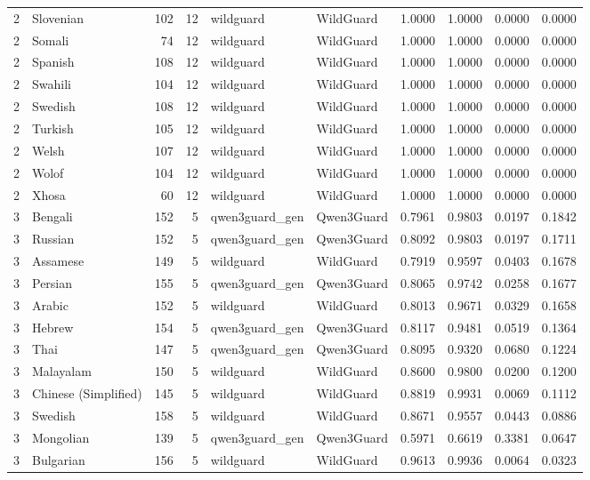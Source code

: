 \begin{tabular}{rlrrllrrrr}
2 & Slovenian & 102 & 12 & wildguard & WildGuard & 1.0000 & 1.0000 & 0.0000 & 0.0000 \\
2 & Somali & 74 & 12 & wildguard & WildGuard & 1.0000 & 1.0000 & 0.0000 & 0.0000 \\
2 & Spanish & 108 & 12 & wildguard & WildGuard & 1.0000 & 1.0000 & 0.0000 & 0.0000 \\
2 & Swahili & 104 & 12 & wildguard & WildGuard & 1.0000 & 1.0000 & 0.0000 & 0.0000 \\
2 & Swedish & 108 & 12 & wildguard & WildGuard & 1.0000 & 1.0000 & 0.0000 & 0.0000 \\
2 & Turkish & 105 & 12 & wildguard & WildGuard & 1.0000 & 1.0000 & 0.0000 & 0.0000 \\
2 & Welsh & 107 & 12 & wildguard & WildGuard & 1.0000 & 1.0000 & 0.0000 & 0.0000 \\
2 & Wolof & 104 & 12 & wildguard & WildGuard & 1.0000 & 1.0000 & 0.0000 & 0.0000 \\
2 & Xhosa & 60 & 12 & wildguard & WildGuard & 1.0000 & 1.0000 & 0.0000 & 0.0000 \\
3 & Bengali & 152 & 5 & qwen3guard\_gen & Qwen3Guard & 0.7961 & 0.9803 & 0.0197 & 0.1842 \\
3 & Russian & 152 & 5 & qwen3guard\_gen & Qwen3Guard & 0.8092 & 0.9803 & 0.0197 & 0.1711 \\
3 & Assamese & 149 & 5 & wildguard & WildGuard & 0.7919 & 0.9597 & 0.0403 & 0.1678 \\
3 & Persian & 155 & 5 & qwen3guard\_gen & Qwen3Guard & 0.8065 & 0.9742 & 0.0258 & 0.1677 \\
3 & Arabic & 152 & 5 & wildguard & WildGuard & 0.8013 & 0.9671 & 0.0329 & 0.1658 \\
3 & Hebrew & 154 & 5 & qwen3guard\_gen & Qwen3Guard & 0.8117 & 0.9481 & 0.0519 & 0.1364 \\
3 & Thai & 147 & 5 & qwen3guard\_gen & Qwen3Guard & 0.8095 & 0.9320 & 0.0680 & 0.1224 \\
3 & Malayalam & 150 & 5 & wildguard & WildGuard & 0.8600 & 0.9800 & 0.0200 & 0.1200 \\
3 & Chinese (Simplified) & 145 & 5 & wildguard & WildGuard & 0.8819 & 0.9931 & 0.0069 & 0.1112 \\
3 & Swedish & 158 & 5 & wildguard & WildGuard & 0.8671 & 0.9557 & 0.0443 & 0.0886 \\
3 & Mongolian & 139 & 5 & qwen3guard\_gen & Qwen3Guard & 0.5971 & 0.6619 & 0.3381 & 0.0647 \\
3 & Bulgarian & 156 & 5 & wildguard & WildGuard & 0.9613 & 0.9936 & 0.0064 & 0.0323 \\

\end{tabular}

